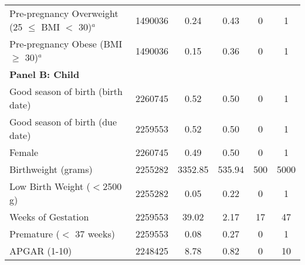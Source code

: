 \documentclass[10pt,letterpaper,subeqn]{beamer}
\begin{document}
\begin{frame}
\begin{table}[htpb!]
\begin{center}
{\begin{tabular}{lccccc}
Pre-pregnancy Overweight (25 $\leq$ BMI $<$ 30)$^{a}$&     1490036&        0.24&        0.43&           0&           1\\

Pre-pregnancy Obese (BMI $\geq$ 30)$^{a}$&     1490036&        0.15&        0.36&           0&           1\\


 \multicolumn{6}{l}{\textbf{Panel B: Child}}\\
 Good season of birth (birth date)&     2260745&        0.52&        0.50&           0&           1\\
Good season of birth (due date)&     2259553&        0.52&        0.50&           0&           1\\
Female              &     2260745&        0.49&        0.50&           0&           1\\
Birthweight (grams) &     2255282&     3352.85&      535.94&         500&        5000\\
Low Birth Weight ($<$2500 g)&     2255282&        0.05&        0.22&           0&           1\\
Weeks of Gestation  &     2259553&       39.02&        2.17&          17&          47\\
Premature ($<$ 37 weeks)&     2259553&        0.08&        0.27&           0&           1\\
APGAR (1-10)        &     2248425&        8.78&        0.82&           0&          10\\

\bottomrule
 \end{tabular}}
\end{center}\end{table}
\end{frame}
\end{document}
